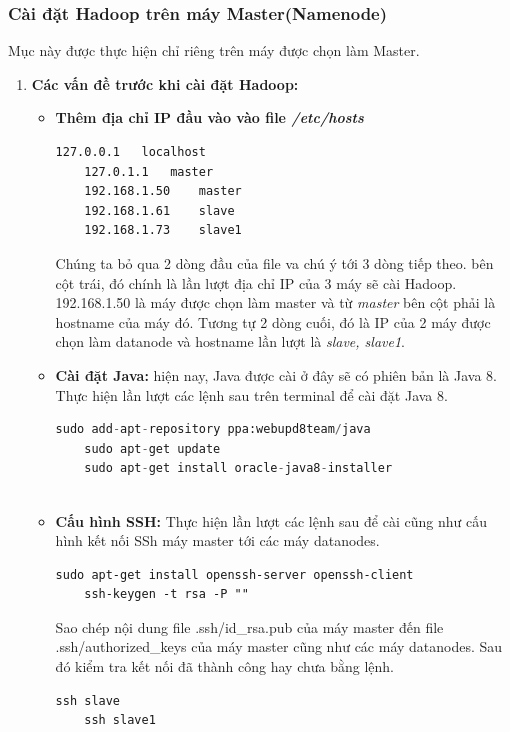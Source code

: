 	\subsubsection{Cài đặt Hadoop trên máy Master(Namenode)}
	Mục này được thực hiện chỉ riêng trên máy được chọn làm Master.
		\begin{enumerate}
			\item \textbf{Các vấn đề trước khi cài đặt Hadoop:}
			\begin{itemize}
			
				\item \textbf{Thêm địa chỉ IP đầu vào vào file \textit{/etc/hosts}}				
				\begin{lstlisting}[caption=Nội dung file /etc/hosts]
	127.0.0.1	localhost
	127.0.1.1	master
	192.168.1.50	master
	192.168.1.61	slave
	192.168.1.73	slave1

				\end{lstlisting}
				Chúng ta bỏ qua 2 dòng đầu của file va chú ý tới 3 dòng tiếp theo. bên cột trái, đó chính là lần lượt địa chỉ IP của 3 máy sẽ cài Hadoop. 192.168.1.50 là máy được chọn làm master và từ \textit{master} bên cột phải là hostname của máy đó. Tương tự 2 dòng cuối, đó là IP của 2 máy được chọn làm datanode và hostname lần lượt là \textit{slave, slave1}.\par 
				\item \textbf{Cài đặt Java:} hiện nay, Java được cài ở đây sẽ có phiên bản là Java 8. Thực hiện lần lượt các lệnh sau trên terminal để cài đặt Java 8.
				
				\begin{lstlisting}[language=python,caption=Cài đặt Java 8]
	sudo add-apt-repository ppa:webupd8team/java	
	sudo apt-get update	
	sudo apt-get install oracle-java8-installer
	
				\end{lstlisting}
				
				\item \textbf{Cấu hình SSH: } Thực hiện lần lượt các lệnh sau để cài cũng như cấu hình kết nối SSh máy master tới các máy datanodes.
				\pagebreak
				\begin{lstlisting}[caption=Cài đặt SSH]
	sudo apt-get install openssh-server openssh-client	
	ssh-keygen -t rsa -P ""	
				\end{lstlisting}
				Sao chép nội dung file .ssh/id\_rsa.pub của máy master đến file .ssh/authorized\_keys của máy master cũng như các máy datanodes. Sau đó kiểm tra kết nối đã thành công hay chưa bằng lệnh.\par
				\begin{lstlisting}[caption=Kết nối SSH]
	ssh slave
	ssh slave1
				\end{lstlisting}
				

\end{itemize}
\end{enumerate}
